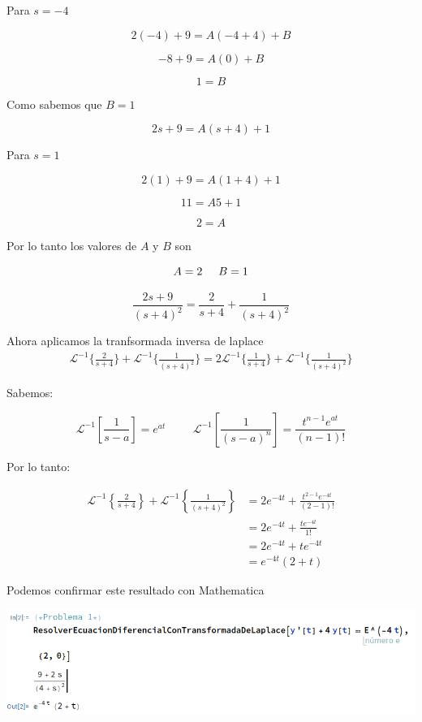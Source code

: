 \documentclass{article}
\begin{document}
Para $s=-4$

\[2(-4)+9 = A(-4+4) + B\]

\[-8 + 9 = A(0) + B\]

\[1 = B\]

Como sabemos que $B=1$

\[2s+9 = A(s+4) + 1\]

Para $s=1$

\[2(1)+9 = A(1+4) + 1\]

\[11 = A5 + 1\]

\[2 = A\]

Por lo tanto los valores de $A$ y $B$ son

\[A=2 \hspace{.5cm} B=1\]

\[\frac{2s+9}{(s + 4)^2} = \frac{2}{s+4} + \frac{1}{(s+4)^2}\]

Ahora aplicamos la tranfsormada inversa de laplace
\begin{align*}
    \mathcal{L}^{-1}\{\frac{2}{s+4}\} + \mathcal{L}^{-1}\{\frac{1}{(s+4)^2}\} = 2\mathcal{L}^{-1}\{\frac{1}{s+4}\} + \mathcal{L}^{-1}\{\frac{1}{(s+4)^2}\}
\end{align*}

Sabemos:

\[ \mathcal{L}^{-1}[\frac{1}{s-a}] = e^{at} \hspace{1cm} \mathcal{L}^{-1}[\frac{1}{(s-a)^n}] = \frac{t^{n-1}e^{at}}{(n-1)!}\]

Por lo tanto:

\begin{align*}
    \mathcal{L}^{-1}\left\{\frac{2}{s+4}\right\} + \mathcal{L}^{-1}\left\{\frac{1}{(s+4)^2}\right\} & = 2e^{-4t} + \frac{t^{2-1}e^{-4t}}{(2-1)!} \\
                                                                                                    & = 2e^{-4t} + \frac{te^{-4t}}{1!}           \\
                                                                                                    & = 2e^{-4t} + te^{-4t}                      \\
                                                                                                    & = e^{-4t}(2+t)
\end{align*}


Podemos confirmar este resultado con Mathematica

\begin{center}
    \includegraphics[width=1\textwidth]{../ED 2/image.png}
\end{center}
\newpage
\end{document}
